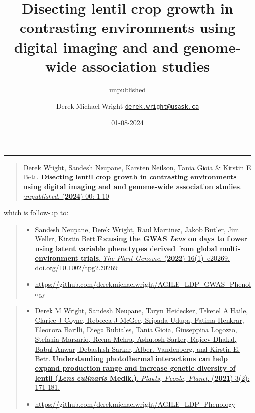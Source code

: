 \documentclass[
]{article}
\title{Disecting lentil crop growth in contrasting environments using
digital imaging and and genome-wide association studies}
\subtitle{unpublished}
\author{Derek Michael Wright
\href{mailto:derek.wright@usask.ca}{\nolinkurl{derek.wright@usask.ca}}}
\date{01-08-2024}
\providecommand{\tightlist}{%
  \setlength{\itemsep}{0pt}\setlength{\parskip}{0pt}}
\begin{document}
\maketitle

{
\setcounter{tocdepth}{2}
\tableofcontents
}
\begin{center}\rule{0.5\linewidth}{0.5pt}\end{center}

\begin{quote}
\href{https://github.com/derekmichaelwright/AGILE_LDP_UAV}{Derek Wright,
Sandesh Neupane, Karsten Neilson, Tania Gioia \& Kirstin E Bett.
\textbf{Disecting lentil crop growth in contrasting environments using
digital imaging and and genome-wide association studies}.
\emph{unpublished}. (\textbf{2024}) 00: 1-10}
\end{quote}

which is follow-up to:

\begin{quote}
\begin{itemize}
\tightlist
\item
  \href{https://doi.org/10.1002/tpg2.20269}{Sandesh Neupane, Derek
  Wright, Raul Martinez, Jakob Butler, Jim Weller, Kirstin
  Bett.\textbf{Focusing the GWAS \emph{Lens} on days to flower using
  latent variable phenotypes derived from global multi-environment
  trials}. \emph{The Plant Genome}. (\textbf{2022}) 16(1): e20269.
  doi.org/10.1002/tpg2.20269}
\item
  \url{https://github.com/derekmichaelwright/AGILE_LDP_GWAS_Phenology}
\end{itemize}
\end{quote}

\begin{quote}
\begin{itemize}
\tightlist
\item
  \href{https://doi.org/10.1002/ppp3.10158}{Derek M Wright, Sandesh
  Neupane, Taryn Heidecker, Teketel A Haile, Clarice J Coyne, Rebecca J
  McGee, Sripada Udupa, Fatima Henkrar, Eleonora Barilli, Diego
  Rubiales, Tania Gioia, Giuseppina Logozzo, Stefania Marzario, Reena
  Mehra, Ashutosh Sarker, Rajeev Dhakal, Babul Anwar, Debashish Sarker,
  Albert Vandenberg, and Kirstin E. Bett. \textbf{Understanding
  photothermal interactions can help expand production range and
  increase genetic diversity of lentil (\emph{Lens culinaris} Medik.)}.
  \emph{Plants, People, Planet}. (\textbf{2021}) 3(2): 171-181.}
\item
  \url{https://github.com/derekmichaelwright/AGILE_LDP_Phenology}
\end{itemize}
\end{quote}
\end{document}

